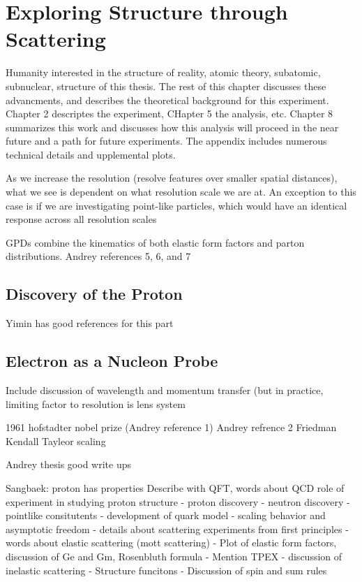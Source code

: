 \section{Exploring Structure through Scattering}\label{ch1:sec1:background}



Humanity interested in the structure of reality, atomic theory, subatomic, subnuclear, structure of this thesis.  The rest of this chapter discusses these advancments, and describes the theoretical background for this experiment. Chapter 2 descriptes the experiment, CHapter 5 the analysis, etc. Chapter 8 summarizes this work and discusses how this analysis will proceed in the near future and a path for future experiments. The appendix includes numerous technical details and upplemental plots.

As we increase the resolution (resolve features over smaller spatial distances), what we see is dependent on what resolution scale we are at. An exception to this case is if we are investigating point-like particles, which would have an identical response across all resolution scales

GPDs combine the kinematics of both elastic form factors and parton distributions. Andrey references 5, 6, and 7

\subsection{Discovery of the Proton}
Yimin has good references for this part
\subsection{Electron as a Nucleon Probe}

Include discussion of wavelength and momentum transfer (but in practice, limiting factor to resolution is lens system %

1961 hofstadter nobel prize (Andrey reference 1)
Andrey refrence 2 Friedman Kendall Tayleor scaling

Andrey thesis good write ups

Sangbaek:
proton has properties
Describe with QFT, words about QCD
role of experiment in studying proton structure
- proton discovery
- neutron discovery
- pointlike consitutents
- development of quark model
- scaling behavior and asymptotic freedom
- details about scattering experiments from first principles
- words about elastic scattering (mott scattering)
- Plot of elastic form factors, discussion of Ge and Gm, Rosenbluth formula
- Mention TPEX
- discussion of inelastic scattering
- Structure funcitons
- Discussion of spin and sum rules

